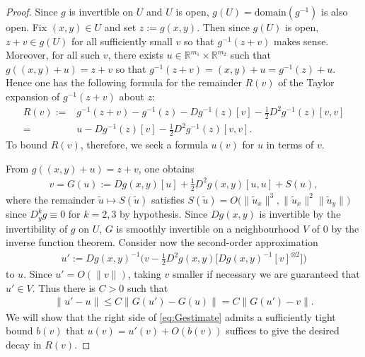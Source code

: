 \documentclass{article}
\newcommand{\RB}{\mathbb{R}}
\theoremstyle{plain}
\theoremstyle{definition}
\theoremstyle{remark}
\begin{document}
\begin{proof}
    Since $g$ is invertible on $U$ and $U$ is open, $g(U) = \text{domain}(g^{-1})$ is also open. Fix $(x,y)\in U$ and set $z:=g(x,y)$. Then since $g(U)$ is open, $z+v\in g(U)$ for all sufficiently small $v$ so that $g^{-1}(z+v)$ makes sense. Moreover, for all such $v$, there exists $u\in\RB^{m_1}\times\RB^{m_2}$ such that $g((x,y)+u) = z+v$ so that $g^{-1}(z+v) = (x,y) +u = g^{-1}(z)+u$. Hence one has the following formula for the remainder $R(v)$ of the Taylor expansion of $g^{-1}(z+v)$ about $z$:
    \begin{align}
        R(v):=&g^{-1}(z+v)-g^{-1}(z) - Dg^{-1}(z)[v]-\frac{1}{2}D^2g^{-1}(z)[v,v]\\=&u - Dg^{-1}(z)[v] -\frac{1}{2}D^2g^{-1}(z)[v,v].\label{eq:R(v)}
    \end{align}
    To bound $R(v)$, therefore, we seek a formula $u(v)$ for $u$ in terms of $v$.
    
    From $g((x,y)+u) = z+v$, one obtains
    \begin{align}
        v = G(u):=Dg(x,y)[u] + \frac{1}{2}D^2g(x,y)[u,u] + S(u),\label{eq:Gdef}
    \end{align}
    where the remainder $\tilde{u}\mapsto S(\tilde{u})$ satisfies $S(\tilde{u}) = O\big(\|\tilde{u}_x\|^3,\|\tilde{u}_x\|^2\|\tilde{u}_y\|\big)$ since $D^k_yg\equiv 0$ for $k=2,3$ by hypothesis. Since $Dg(x,y)$ is invertible by the invertibility of $g$ on $U$, $G$ is smoothly invertible on a neighbourhood $V$ of $0$ by the inverse function theorem. Consider now the second-order approximation
    \begin{align}
        u':=Dg(x,y)^{-1}\bigg(v-\frac{1}{2}D^2g(x,y)\big[Dg(x,y)^{-1}[v]^{\otimes2}\big]\bigg)
    \end{align}
    to $u$. Since $u'= O(\|v\|)$, taking $v$ smaller if necessary we are guaranteed that $u'\in V$. Thus there is $C>0$ such that
    \begin{align}
        \|u'-u\|\leq C\|G(u')-G(u)\| = C\|G(u')-v\|.\label{eq:Gestimate}
    \end{align}
    We will show that the right side of \eqref{eq:Gestimate} admits a sufficiently tight bound $b(v)$ that $u(v) = u'(v) + O(b(v))$ suffices to give the desired decay in $R(v)$.
    

\end{proof}
\end{document}
